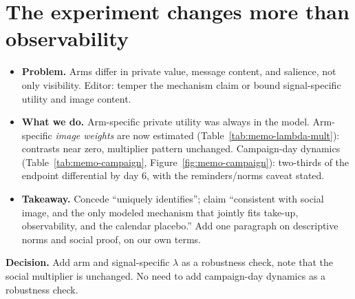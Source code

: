 \documentclass[11pt]{article}
\providecommand{\StructuralRobustnessPath}{appendix/structural-robustness}
\providecommand{\StructuralRobustnessPath}{../appendix/structural-robustness}
\newenvironment{decision}
  {\par\medskip\noindent\begin{minipage}{\linewidth}\color{blue!50!black}\textbf{Decision.} }
  {\end{minipage}\par\medskip}
\begin{document}
\clearpage
\section{The experiment changes more than observability}

\begin{itemize}[nosep]
  \item \textbf{Problem.} Arms differ in private value, message content, and salience,
    not only visibility. Editor: temper the mechanism claim or bound signal-specific
    utility and image content.
  \item \textbf{What we do.} Arm-specific private utility was always in the model.
    Arm-specific \emph{image weights} are now estimated (Table~\ref{tab:memo-lambda-mult}):
    contrasts near zero, multiplier pattern unchanged. Campaign-day dynamics
    (Table~\ref{tab:memo-campaign}, Figure~\ref{fig:memo-campaign}): two-thirds of the
    endpoint differential by day 6, with the reminders/norms caveat stated.
  \item \textbf{Takeaway.} Concede ``uniquely identifies''; claim ``consistent with
    social image, and the only modeled mechanism that jointly fits take-up,
    observability, and the calendar placebo.'' Add one paragraph on descriptive norms
    and social proof, on our own terms.
\end{itemize}

\begin{decision}
  Add arm and signal-specific $\lambda$ as a robustness check, note that the social multiplier is unchanged. No need to add 
  campaign-day dynamics as a robustness check.
\end{decision}

\begin{table}[htbp]
  \centering
  \small
  \caption{Social multipliers under alternative social-image weights
    (\texttt{sections/signal-specific-lambda.tex})}
  \label{tab:memo-lambda-mult}
  
\end{table}

\begin{table}[htbp]
  \centering
  \small
  \caption{Evolution of treatment-by-Far interactions over the campaign
    (\texttt{sections/campaign-day-dynamics.tex})}
  \label{tab:memo-campaign}
\end{table}
\end{document}
